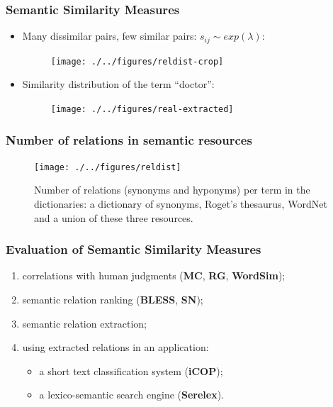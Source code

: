\begin{frame}
\frametitle{Semantic Similarity Measures}
\begin{itemize}

\item Many dissimilar pairs, few similar pairs: $s_{ij} \sim exp(\lambda)$:

\begin{figure}
\centering
\texttt{[image: ./../figures/reldist-crop]}
\end{figure}

\item Similarity distribution of the term ``doctor'': 

\begin{figure}
\centering
\texttt{[image: ./../figures/real-extracted]}
\end{figure} 

\end{itemize}
\end{frame}




\begin{frame}
\frametitle{Number of relations in semantic resources}
\begin{figure}
\centering
\texttt{[image: ./../figures/reldist]}
\caption{ Number of relations (synonyms and hyponyms) per term in the dictionaries: a dictionary of synonyms, Roget's thesaurus, WordNet and a union of these three resources.  }
\label{fig:sim-distribution}
\end{figure}

\end{frame}


\begin{frame}
\frametitle{Evaluation of Semantic Similarity Measures}

\begin{enumerate}
\item correlations with human judgments (\textbf{MC}, \textbf{RG}, \textbf{WordSim});
\item semantic relation ranking (\textbf{BLESS}, \textbf{SN});
\item semantic relation extraction;
\item using extracted relations in an application:
\begin{itemize}
\item a short text classification system (\textbf{iCOP});
\item a lexico-semantic search engine (\textbf{Serelex}).
\end{itemize}
\end{enumerate}

\end{frame}









